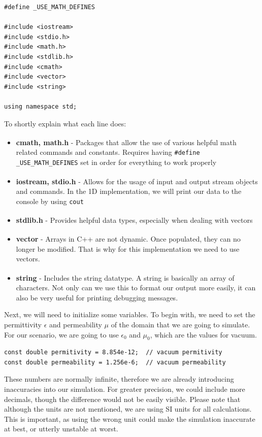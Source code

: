 \begin{verbatim}
#define _USE_MATH_DEFINES
	
#include <iostream>
#include <stdio.h>
#include <math.h>
#include <stdlib.h>
#include <cmath>
#include <vector>
#include <string>

using namespace std;
\end{verbatim}

To shortly explain what each line does:

\begin{itemize}
	\item \textbf{cmath, math.h}\textsuperscript{\cite{cmath}} - Packages that allow the use of various helpful math related commands and constants. Requires having \space \verb!#define _USE_MATH_DEFINES! set in order for everything to work properly
	\item \textbf{iostream, stdio.h}\textsuperscript{\cite{iostream}} - Allows for the usage of input and output stream objects and commands. In the 1D implementation, we will print our data to the console by using \verb!cout!
	\item \textbf{stdlib.h}\textsuperscript{\cite{cstdlib}} - Provides helpful data types, especially when dealing with vectors
	\item \textbf{vector}\textsuperscript{\cite{vector}} - Arrays in C++ are not dynamic. Once populated, they can no longer be modified. That is why for this implementation we need to use vectors.
	\item \textbf{string}\textsuperscript{\cite{string}} - Includes the string datatype. A string is basically an array of characters. Not only can we use this to format our output more easily, it can also be very useful for printing debugging messages.
\end{itemize}

Next, we will need to initialize some variables. To begin with, we need to set the permittivity $\epsilon$ and permeability $\mu$ of the domain that we are going to simulate. For our scenario, we are going to use $\epsilon_{0}$ and $\mu_{0}$, which are the values for vacuum.

\begin{verbatim}
const double permitivity = 8.854e-12;  // vacuum permitivity
const double permeability = 1.256e-6;  // vacuum permeability
\end{verbatim}

These numbers are normally infinite, therefore we are already introducing inaccuracies into our simulation. For greater precision, we could include more decimals, though the difference would not be easily visible. Please note that although the units are not mentioned, we are using SI units for all calculations. This is important, as using the wrong unit could make the simulation inaccurate at best, or utterly unstable at worst.

